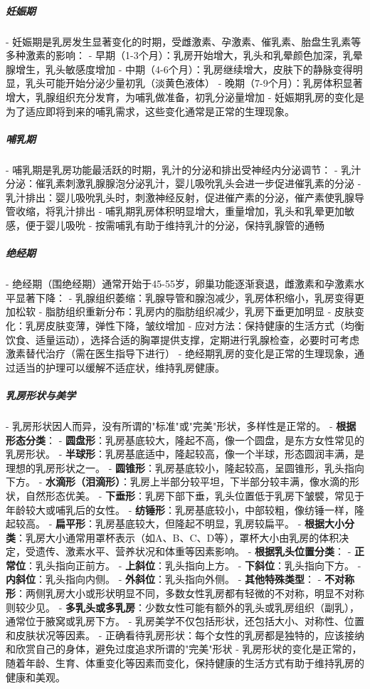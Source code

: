 \begin{enumerate}
\subparagraph{妊娠期}
- 妊娠期是乳房发生显著变化的时期，受雌激素、孕激素、催乳素、胎盘生乳素等多种激素的影响：
  - 早期（1-3个月）：乳房开始增大，乳头和乳晕颜色加深，乳晕腺增生，乳头敏感度增加
  - 中期（4-6个月）：乳房继续增大，皮肤下的静脉变得明显，乳头可能开始分泌少量初乳（淡黄色液体）
  - 晚期（7-9个月）：乳房体积显著增大，乳腺组织充分发育，为哺乳做准备，初乳分泌量增加
- 妊娠期乳房的变化是为了适应即将到来的哺乳需求，这些变化通常是正常的生理现象。

\subparagraph{哺乳期}
- 哺乳期是乳房功能最活跃的时期，乳汁的分泌和排出受神经内分泌调节：
  - 乳汁分泌：催乳素刺激乳腺腺泡分泌乳汁，婴儿吸吮乳头会进一步促进催乳素的分泌
  - 乳汁排出：婴儿吸吮乳头时，刺激神经反射，促进催产素的分泌，催产素使乳腺导管收缩，将乳汁排出
  - 哺乳期乳房体积明显增大，重量增加，乳头和乳晕更加敏感，便于婴儿吸吮
  - 按需哺乳有助于维持乳汁的分泌，保持乳腺管的通畅

\subparagraph{绝经期}
- 绝经期（围绝经期）通常开始于45-55岁，卵巢功能逐渐衰退，雌激素和孕激素水平显著下降：
  - 乳腺组织萎缩：乳腺导管和腺泡减少，乳房体积缩小，乳房变得更加松软
  - 脂肪组织重新分布：乳房内的脂肪组织减少，乳房下垂更加明显
  - 皮肤变化：乳房皮肤变薄，弹性下降，皱纹增加
  - 应对方法：保持健康的生活方式（均衡饮食、适量运动），选择合适的胸罩提供支撑，定期进行乳腺检查，必要时可考虑激素替代治疗（需在医生指导下进行）
- 绝经期乳房的变化是正常的生理现象，通过适当的护理可以缓解不适症状，维持乳房健康。

\subparagraph{乳房形状与美学}
- 乳房形状因人而异，没有所谓的"标准"或"完美"形状，多样性是正常的。
- \textbf{根据形态分类}：
  - \textbf{圆盘形}：乳房基底较大，隆起不高，像一个圆盘，是东方女性常见的乳房形状。
  - \textbf{半球形}：乳房基底适中，隆起较高，像一个半球，形态圆润丰满，是理想的乳房形状之一。
  - \textbf{圆锥形}：乳房基底较小，隆起较高，呈圆锥形，乳头指向下方。
  - \textbf{水滴形（泪滴形）}：乳房上半部分较平坦，下半部分较丰满，像水滴的形状，自然形态优美。
  - \textbf{下垂形}：乳房下部下垂，乳头位置低于乳房下皱襞，常见于年龄较大或哺乳后的女性。
  - \textbf{纺锤形}：乳房基底较小，中部较粗，像纺锤一样，隆起较高。
  - \textbf{扁平形}：乳房基底较大，但隆起不明显，乳房较扁平。
- \textbf{根据大小分类}：乳房大小通常用罩杯表示（如A、B、C、D等），罩杯大小由乳房的体积决定，受遗传、激素水平、营养状况和体重等因素影响。
- \textbf{根据乳头位置分类}：
  - \textbf{正常位}：乳头指向正前方。
  - \textbf{上斜位}：乳头指向上方。
  - \textbf{下斜位}：乳头指向下方。
  - \textbf{内斜位}：乳头指向内侧。
  - \textbf{外斜位}：乳头指向外侧。
- \textbf{其他特殊类型}：
  - \textbf{不对称形}：两侧乳房大小或形状明显不同，多数女性乳房都有轻微的不对称，明显不对称则较少见。
  - \textbf{多乳头或多乳房}：少数女性可能有额外的乳头或乳房组织（副乳），通常位于腋窝或乳房下方。
- 乳房美学不仅包括形状，还包括大小、对称性、位置和皮肤状况等因素。
- 正确看待乳房形状：每个女性的乳房都是独特的，应该接纳和欣赏自己的身体，避免过度追求所谓的"完美"形状
- 乳房形状的变化是正常的，随着年龄、生育、体重变化等因素而变化，保持健康的生活方式有助于维持乳房的健康和美观。


\end{enumerate}
